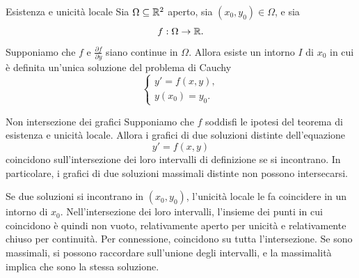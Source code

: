 \documentclass[a4paper]{article}
\begin{document}
\begin{radioactive}
\begin{snippettheorem}{Esistenza e unicità locale}
    Sia \(\Omega\subseteq\mathbb{R}^2\) aperto, sia \((x_0,y_0)\in\Omega\), e sia
    \[
        f:\Omega\to\mathbb{R}.
    \]
    Supponiamo che \(f\) e \(\frac{\partial f}{\partial y}\) siano continue in \(\Omega\). Allora esiste un intorno \(I\) di \(x_0\) in cui è definita un'unica soluzione del problema di Cauchy
    \[
        \begin{cases}
            y'=f(x,y),\\
            y(x_0)=y_0.
        \end{cases}
    \]
\end{snippettheorem}
\end{radioactive}

\begin{radioactive}
\begin{snippetcorollary}{Non intersezione dei grafici}
    Supponiamo che \(f\) soddisfi le ipotesi del teorema di esistenza e unicità locale. Allora i grafici di due soluzioni distinte dell'equazione
    \[
        y'=f(x,y)
    \]
    coincidono sull'intersezione dei loro intervalli di definizione se si incontrano.
    In particolare, i grafici di due soluzioni massimali distinte non possono intersecarsi.

    \begin{center}
    \end{center}
\end{snippetcorollary}
\end{radioactive}

\begin{radioactive}
\begin{snippetproof}{}
    Se due soluzioni si incontrano in \((x_0,y_0)\), l'unicità locale le fa
    coincidere in un intorno di \(x_0\). Nell'intersezione dei loro intervalli,
    l'insieme dei punti in cui coincidono è quindi non vuoto, relativamente
    aperto per unicità e relativamente chiuso per continuità. Per connessione,
    coincidono su tutta l'intersezione. Se sono massimali, si possono raccordare
    sull'unione degli intervalli, e la massimalità implica che sono la stessa soluzione.
\end{snippetproof}
\end{radioactive}
\end{document}
